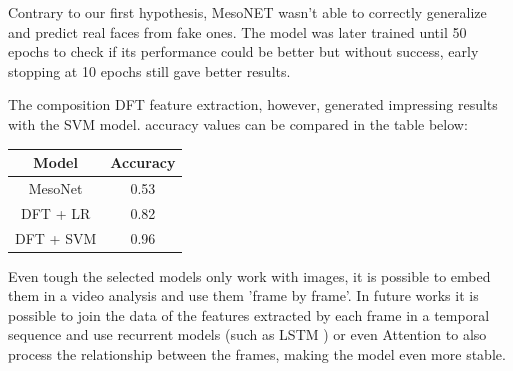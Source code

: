 \documentclass{bmvc2k}
\begin{document}
Contrary to our first hypothesis, MesoNET wasn't able to correctly generalize and predict real faces from fake ones. The model was later trained until 50 epochs to check if its performance could be better but without success, early stopping at 10 epochs still gave better results.

The composition DFT feature extraction, however, generated impressing results with the SVM model. accuracy values can be compared in the table below:

\begin{center}
\begin{tabular}{|c|c|}
 \hline
 Model & Accuracy\\
 \hline
 MesoNet & 0.53 \\ 
 \hline
 DFT + LR & 0.82 \\
 \hline
 DFT + SVM & 0.96 \\
 \hline
\end{tabular}
\end{center}

Even tough the selected models only work with images, it is possible to embed them in a video analysis and use them 'frame by frame'. In future works it is possible to join the data of the features extracted by each frame in a temporal sequence and use recurrent models (such as LSTM \cite{hochreiter1997long}) or even Attention \cite{vaswani2017attention} to also process the relationship between the frames, making the model even more stable.



\end{document}
